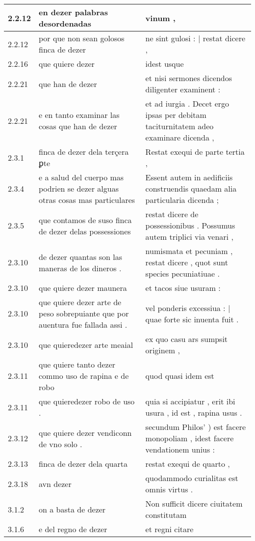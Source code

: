 \begin{tabular}{|p{1cm}|p{6.5cm}|p{6.5cm}|}
2.2.12 & en dezer palabras desordenadas & vinum , \\\hline
2.2.12 & por que non sean golosos finca de dezer & ne sint gulosi : | restat dicere , \\\hline
2.2.16 & que quiere dezer & idest usque \\\hline
2.2.21 & que han de dezer & et nisi sermones dicendos diligenter examinent : \\\hline
2.2.21 & e en tanto examinar las cosas que han de dezer & et ad iurgia . Decet ergo ipsas per debitam taciturnitatem adeo examinare dicenda , \\\hline
2.3.1 & finca de dezer dela terçera ꝑte & Restat exequi de parte tertia , \\\hline
2.3.4 & e a salud del cuerpo mas podrien se dezer alguas otras cosas mas particulares & Essent autem in aedificiis construendis quaedam alia particularia dicenda ; \\\hline
2.3.5 & que contamos de suso finca de dezer delas possessiones & restat dicere de possessionibus . Possumus autem triplici via venari , \\\hline
2.3.10 & de dezer quantas son las maneras de los dineros . & numismata et pecuniam , restat dicere , quot sunt species pecuniatiuae . \\\hline
2.3.10 & que quiere dezer maunera & et tacos siue usuram : \\\hline
2.3.10 & que quiere dezer arte de peso sobrepuiante que por auentura fue fallada assi . & vel ponderis excessiua : | quae forte sic inuenta fuit . \\\hline
2.3.10 & que quieredezer arte meaial & ex quo casu ars sumpsit originem , \\\hline
2.3.11 & que quiere tanto dezer commo uso de rapina e de robo & quod quasi idem est \\\hline
2.3.11 & que quieredezer robo de uso . & quia si accipiatur , erit ibi usura , id est , rapina usus . \\\hline
2.3.12 & que quiere dezer vendiconn de vno solo . & secundum Philos’ ) est facere monopoliam , idest facere vendationem unius : \\\hline
2.3.13 & finca de dezer dela quarta & restat exequi de quarto , \\\hline
2.3.18 & avn dezer & quodammodo curialitas est omnis virtus . \\\hline
3.1.2 & on a basta de dezer & Non sufficit dicere ciuitatem constitutam \\\hline
3.1.6 & e del regno de dezer & et regni citare \\\hline

\end{tabular}
